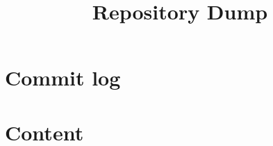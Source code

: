 \documentclass[10pt]{scrartcl}
\subtitle{}
\author{}
\title{Repository Dump}
\begin{document}
	\maketitle
	\section*{Commit log}
	\texttt{}
	\section*{Content}
	

	
	
\end{document}
